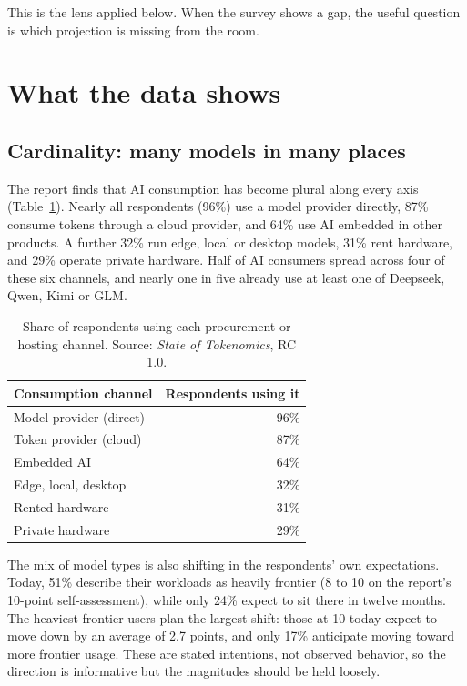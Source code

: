 \documentclass[11pt,a4paper]{article}
\begin{document}
This is the lens applied below. When the survey shows a gap, the useful question is which projection is missing from the room.

\section{What the data shows}

\subsection{Cardinality: many models in many places}

The report finds that AI consumption has become plural along every axis (Table~\ref{tab:surfaces}). Nearly all respondents (96\%) use a model provider directly, 87\% consume tokens through a cloud provider, and 64\% use AI embedded in other products. A further 32\% run edge, local or desktop models, 31\% rent hardware, and 29\% operate private hardware. Half of AI consumers spread across four of these six channels, and nearly one in five already use at least one of Deepseek, Qwen, Kimi or GLM.

\begin{table}[h]
\centering
\small
\begin{tabular}{@{}lr@{}}
\toprule
Consumption channel & Respondents using it \\
\midrule
Model provider (direct) & 96\% \\
Token provider (cloud) & 87\% \\
Embedded AI & 64\% \\
Edge, local, desktop & 32\% \\
Rented hardware & 31\% \\
Private hardware & 29\% \\
\bottomrule
\end{tabular}
\caption{Share of respondents using each procurement or hosting channel. Source: \emph{State of Tokenomics}, RC 1.0.}
\label{tab:surfaces}
\end{table}

The mix of model types is also shifting in the respondents' own expectations. Today, 51\% describe their workloads as heavily frontier (8 to 10 on the report's 10-point self-assessment), while only 24\% expect to sit there in twelve months. The heaviest frontier users plan the largest shift: those at 10 today expect to move down by an average of 2.7 points, and only 17\% anticipate moving toward more frontier usage. These are stated intentions, not observed behavior, so the direction is informative but the magnitudes should be held loosely.
\end{document}
